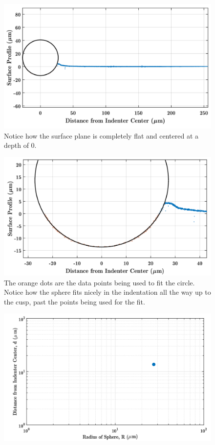 \begin{figure}
	\centering
	\includegraphics[width=\linewidth]{Chapters/Figures/sphere011_ia/circle_fit}
	\caption[Circle Fit]{Notice how the surface plane is completely flat and centered at a depth of 0.}
	\label{fig:circlefit}
\end{figure}
\begin{figure}
	\centering
	\includegraphics[width=\linewidth]{Chapters/Figures/sphere011_ia/circle_fit_zoomed}
	\caption[Circle Fit Zoomed]{The orange dots are the data points being used to fit the circle. Notice how the sphere fits nicely in the indentation all the way up to the cusp, past the points being used for the fit.}
	\label{fig:circlefitzoomed}
\end{figure}
\begin{figure}
	\centering
	\includegraphics[width=\linewidth]{Chapters/Figures/sphere011_ia/single_d_vs_r}
	\caption[D vs R plot]{}
	\label{fig:singledvsr}
\end{figure}
